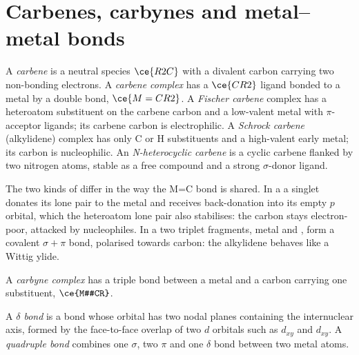 \section{Carbenes, carbynes and metal--metal bonds}

\begin{definition}\label{def:b3:organometallic-bonding:carbene}
A \emph{carbene} is a neutral species $\ce{R2C}$ with a divalent carbon
carrying two non-bonding electrons. A \emph{carbene complex} has a $\ce{CR2}$ ligand bonded to a metal by a double bond, $\ce{M=CR2}$. A
\emph{Fischer carbene} complex has a heteroatom substituent
on the carbene carbon and a low-valent metal with $\pi$-acceptor ligands; its carbene
carbon is electrophilic. A \emph{Schrock carbene} (alkylidene)
complex has only C or H substituents and a high-valent early metal; its carbon is
nucleophilic. An \emph{N-heterocyclic carbene} is a
cyclic carbene flanked by two nitrogen atoms, stable as a free compound and a strong
$\sigma$-donor ligand.
\end{definition}

The two kinds of  differ in the way the M=C bond is shared.
In a  a singlet  donates its lone pair to the metal and
receives back-donation into its empty $p$ orbital, which the heteroatom lone pair
also stabilises: the carbon stays electron-poor, attacked by nucleophiles. In a
 two triplet fragments, metal and , form a covalent $\sigma +
\pi$ bond, polarised towards carbon: the alkylidene behaves like a Wittig ylide.

\begin{definition}\label{def:b3:organometallic-bonding:carbyne}
A \emph{carbyne complex} has a triple bond between a metal
and a carbon carrying one substituent, $\ce{M#CR}$.
\end{definition}

\begin{definition}\label{def:b3:organometallic-bonding:delta}
A \emph{$\delta$ bond} is a bond whose orbital has two nodal planes
containing the internuclear axis, formed by the face-to-face overlap of two $d$
orbitals such as $d_{xy}$ and $d_{xy}$. A \emph{quadruple bond}
combines one $\sigma$, two $\pi$ and one $\delta$ bond between two metal atoms.
\end{definition}

